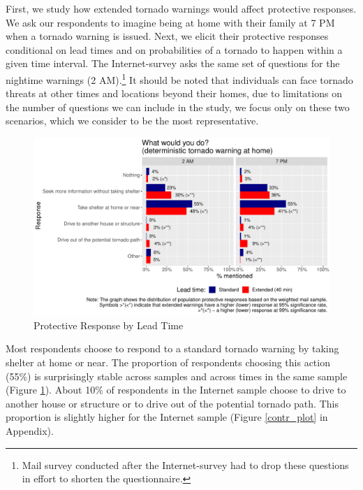\documentclass{ametsocV6.1}
\begin{document}
First, we study how extended tornado warnings would affect protective responses. We ask our respondents to imagine being at home with their family at 7 PM when a tornado warning is issued. Next, we elicit their protective responses conditional on lead times and on probabilities of a tornado to happen within a given time interval. The Internet-survey asks the same set of questions for the nightime warnings (2 AM).\footnote{Mail survey conducted after the Internet-survey had to drop these questions in effort to shorten the questionnaire.} It should be noted that individuals can face tornado threats at other times and locations beyond their homes, due to limitations on the number of questions we can include in the study, we focus only on these two scenarios, which we consider to be the most representative. 
\begin{figure}[!htbp]
\centering
\includegraphics[width=33pc]{../Graphs/comp_responses_w.pdf} 
\caption{Protective Response by Lead Time}\label{comp_responses}
\end{figure}
Most respondents choose to respond to a standard tornado warning by taking shelter at home or near. The proportion of respondents choosing this action (55\%) is surprisingly stable across samples and across times in the same sample (Figure \ref{comp_responses}). About 10\% of respondents in the Internet sample choose to drive to another house or structure or to drive out of the potential tornado path. This proportion is slightly higher for the Internet sample (Figure \ref{contr_plot} in Appendix).
\end{document}
